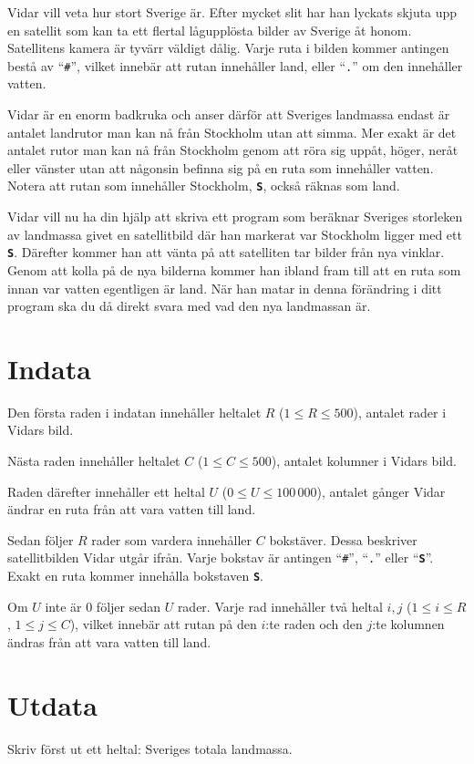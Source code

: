 Vidar vill veta hur stort Sverige är. Efter mycket slit har han lyckats skjuta upp en satellit som kan ta ett flertal lågupplösta bilder av Sverige åt honom.
Satellitens kamera är tyvärr väldigt dålig. Varje ruta i bilden kommer antingen bestå av ``\texttt{\#}'', vilket innebär att rutan innehåller land, eller
``\texttt{.}'' om den innehåller vatten.

Vidar är en enorm badkruka och anser därför att Sveriges landmassa endast är antalet landrutor man kan nå från Stockholm utan att simma.
Mer exakt är det antalet rutor man kan nå från Stockholm genom att röra sig uppåt, höger, neråt eller vänster utan att någonsin befinna sig på en ruta som innehåller vatten.
Notera att rutan som innehåller Stockholm, \textbf{\texttt{S}}, också räknas som land.

Vidar vill nu ha din hjälp att skriva ett program som beräknar Sveriges storleken av landmassa givet en satellitbild där han markerat var Stockholm ligger med ett \textbf{\texttt{S}}.
Därefter kommer han att vänta på att satelliten tar bilder från nya vinklar. Genom att kolla på de nya bilderna kommer han ibland fram till att en ruta som
innan var vatten egentligen är land. När han matar in denna förändring i ditt program ska du då direkt svara med vad den nya landmassan är.


\section*{Indata}
Den första raden i indatan innehåller heltalet $R$ ($1 \le R \le 500$), antalet rader i Vidars bild.

Nästa raden innehåller heltalet $C$ ($1 \le C \le 500$), antalet kolumner i Vidars bild.

Raden därefter innehåller ett heltal $U$ ($0 \le U \le 100\,000$), antalet gånger Vidar ändrar en ruta från att vara vatten till land.

Sedan följer $R$ rader som vardera innehåller $C$ bokstäver. Dessa beskriver satellitbilden Vidar utgår ifrån. Varje bokstav är antingen
``\texttt{\#}'', ``\texttt{.}'' eller ``\textbf{\texttt{S}}''. Exakt en ruta kommer innehålla bokstaven \textbf{\texttt{S}}.

Om $U$ inte är $0$ följer sedan $U$ rader. Varje rad innehåller två heltal $i,j$ ($1 \le i \le R$, $1 \le j \le C$), vilket innebär att rutan
på den $i$:te raden och den $j$:te kolumnen ändras från att vara vatten till land. 

\section*{Utdata}
Skriv först ut ett heltal: Sveriges totala landmassa.


